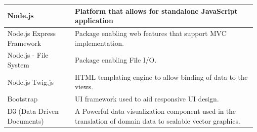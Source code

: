 \documentclass[12pt]{article} %
\begin{document}
\begin{center}
\begin{tabular}{ | p{3.5cm} | p{12cm} |}
		 	\hline
		 	Node.js & Platform that allows for standalone JavaScript application\\
		 	\hline
		 	Node.js Express Framework & Package enabling web features that support MVC implementation.\\
		 	\hline
		 	Node.js - File System & Package enabling File I/O.\\
		 	\hline
		 	Node.js Twig.js & HTML templating engine to allow binding of data to the views.\\
		 	\hline
		 	Bootstrap & UI framework used to aid responsive UI design.\\
		 	\hline
		 	D3 (Data Driven Documents) & A Powerful data visualization component used in the translation of domain data to scalable vector graphics.\\
		 	\hline
	 	\end{tabular}
	 \end{center}
	 
	
	
\end{document}
